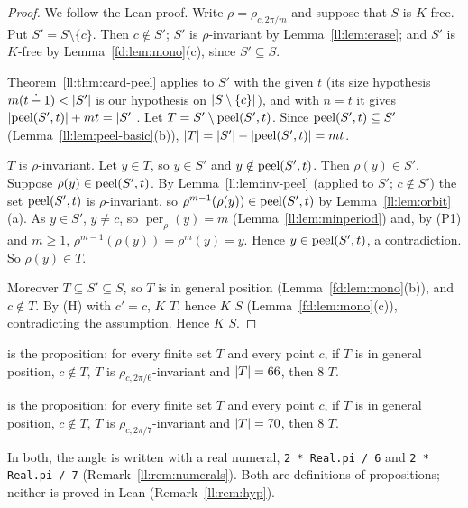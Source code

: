 \begin{proof}
We follow the Lean proof. Write $\rho=\rho_{c,2\pi/m}$ and suppose that $S$ is $K$-free. Put $S'=S\setminus\{c\}$. Then
$c\notin S'$; $S'$ is $\rho$-invariant by Lemma~\ref{ll:lem:erase}; and $S'$ is $K$-free by
Lemma~\ref{fd:lem:mono}(c), since $S'\subseteq S$.

Theorem~\ref{ll:thm:card-peel} applies to $S'$ with the given $t$ (its size hypothesis $m(t\mathbin{\dot{-}}1)<\lvert S'\rvert$
is our hypothesis on $\lvert S\setminus\{c\}\rvert$), and with $n=t$ it gives $\lvert\operatorname{peel}(S',t)\rvert+mt=\lvert S'\rvert$.
Let $T=S'\setminus\operatorname{peel}(S',t)$. Since $\operatorname{peel}(S',t)\subseteq S'$ (Lemma~\ref{ll:lem:peel-basic}(b)),
$\lvert T\rvert=\lvert S'\rvert-\lvert\operatorname{peel}(S',t)\rvert=mt$.

$T$ is $\rho$-invariant. Let $y\in T$, so $y\in S'$ and $y\notin\operatorname{peel}(S',t)$. Then $\rho(y)\in S'$. Suppose
$\rho(y)\in\operatorname{peel}(S',t)$. By Lemma~\ref{ll:lem:inv-peel} (applied to $S'$; $c\notin S'$) the set $\operatorname{peel}(S',t)$ is
$\rho$-invariant, so $\rho^{m-1}(\rho(y))\in\operatorname{peel}(S',t)$ by Lemma~\ref{ll:lem:orbit}(a). As $y\in S'$, $y\ne c$, so
$\operatorname{per}_\rho(y)=m$ (Lemma~\ref{ll:lem:minperiod}) and, by (P1) and $m\ge1$,
$\rho^{m-1}(\rho(y))=\rho^m(y)=y$. Hence $y\in\operatorname{peel}(S',t)$, a contradiction. So $\rho(y)\in T$.

Moreover $T\subseteq S'\subseteq S$, so $T$ is in general position (Lemma~\ref{fd:lem:mono}(b)), and $c\notin T$. By (H)
with $c'=c$,  $K$ $T$, hence  $K$ $S$ (Lemma~\ref{fd:lem:mono}(c)),
contradicting the assumption. Hence  $K$ $S$.
\end{proof}

\begin{definition}\label{ll:def:66-70}
 is the proposition: for every finite set $T$ and every point $c$, if $T$ is in general position,
$c\notin T$, $T$ is $\rho_{c,2\pi/6}$-invariant and $\lvert T\rvert=66$, then  $8$ $T$.

 is the proposition: for every finite set $T$ and every point $c$, if $T$ is in general position,
$c\notin T$, $T$ is $\rho_{c,2\pi/7}$-invariant and $\lvert T\rvert=70$, then  $8$ $T$.

In both, the angle is written with a real numeral, \texttt{2 * Real.pi / 6} and \texttt{2 * Real.pi / 7}
(Remark~\ref{ll:rem:numerals}). Both are definitions of propositions; neither is proved in Lean
(Remark~\ref{ll:rem:hyp}).
\end{definition}

